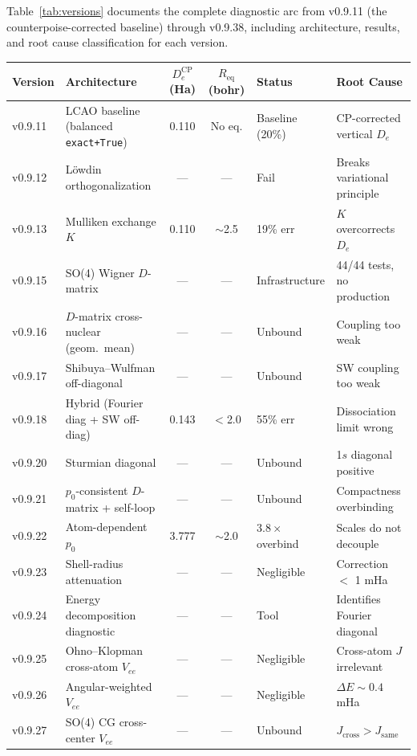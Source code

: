\documentclass[aps,pra,twocolumn,superscriptaddress,longbibliography]{revtex4-2}
\begin{document}
Table~\ref{tab:versions} documents the complete diagnostic arc from
v0.9.11 (the counterpoise-corrected baseline) through v0.9.38, including
architecture, results, and root cause classification for each version.

\begin{table}[t]
\centering
\small
\begin{tabular}{llccll}
\toprule
Version & Architecture & $D_e^{\mathrm{CP}}$ (Ha) & $R_{\mathrm{eq}}$ (bohr)
& Status & Root Cause \\
\midrule
v0.9.11 & LCAO baseline (balanced \texttt{exact+True})
  & 0.110 & No eq. & Baseline (20\%) & CP-corrected vertical $D_e$ \\
v0.9.12 & L\"owdin orthogonalization
  & --- & --- & Fail & Breaks variational principle \\
v0.9.13 & Mulliken exchange $K$
  & 0.110 & $\sim$2.5 & 19\% err & $K$ overcorrects $D_e$ \\
v0.9.15 & SO(4) Wigner $D$-matrix
  & --- & --- & Infrastructure & 44/44 tests, no production \\
v0.9.16 & $D$-matrix cross-nuclear (geom.\ mean)
  & --- & --- & Unbound & Coupling too weak \\
v0.9.17 & Shibuya--Wulfman off-diagonal
  & --- & --- & Unbound & SW coupling too weak \\
v0.9.18 & Hybrid (Fourier diag + SW off-diag)
  & 0.143 & $<$2.0 & 55\% err & Dissociation limit wrong \\
v0.9.20 & Sturmian diagonal
  & --- & --- & Unbound & 1$s$ diagonal positive \\
v0.9.21 & $p_0$-consistent $D$-matrix + self-loop
  & --- & --- & Unbound & Compactness overbinding \\
v0.9.22 & Atom-dependent $p_0$
  & 3.777 & $\sim$2.0 & $3.8\times$ overbind & Scales do not decouple \\
v0.9.23 & Shell-radius attenuation
  & --- & --- & Negligible & Correction $<$ 1 mHa \\
v0.9.24 & Energy decomposition diagnostic
  & --- & --- & Tool & Identifies Fourier diagonal \\
v0.9.25 & Ohno--Klopman cross-atom $V_{ee}$
  & --- & --- & Negligible & Cross-atom $J$ irrelevant \\
v0.9.26 & Angular-weighted $V_{ee}$
  & --- & --- & Negligible & $\Delta E \sim 0.4$ mHa \\
v0.9.27 & SO(4) CG cross-center $V_{ee}$
  & --- & --- & Unbound & $J_{\mathrm{cross}} > J_{\mathrm{same}}$ \\

\end{tabular}
\end{table}
\end{document}
